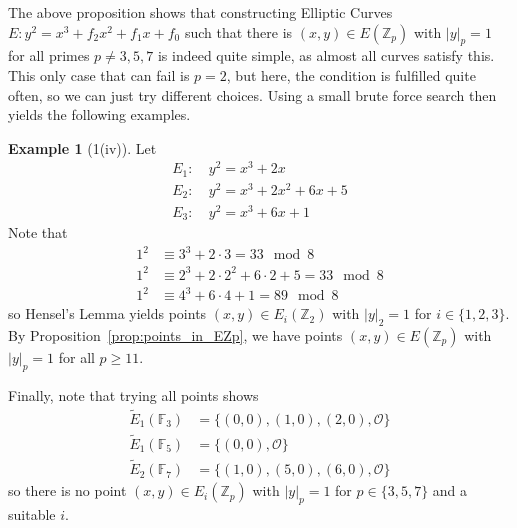 \documentclass{scrartcl}
\newcommand{\Z}{\mathbb{Z}}
\newcommand{\F}{\mathbb{F}}
\renewcommand{\O}{\mathcal{O}}
\theoremstyle{definition}
\newtheorem{example}[subsection]{Example}
\begin{document}
The above proposition shows that constructing Elliptic Curves $E: y^2 = x^3 + f_2 x^2 + f_1 x + f_0$ such that there is $(x, y) \in E(\Z_p)$ with $|y|_p = 1$ for all primes $p \neq 3, 5, 7$ is indeed quite simple, as almost all curves satisfy this.
This only case that can fail is $p = 2$, but here, the condition is fulfilled quite often, so we can just try different choices.
Using a small brute force search then yields the following examples.
\begin{example}[1(iv)]
    Let
    \begin{align*}
        E_1: \ &y^2 = x^3 + 2 x \\
        E_2: \ &y^2 = x^3 + 2 x^2 + 6 x + 5\\
        E_3: \ &y^2 = x^3 + 6x + 1
    \end{align*}
    Note that
    \begin{align*}
        1^2 &\equiv 3^3 + 2 \cdot 3 = 33 \mod 8 \\
        1^2 &\equiv 2^3 + 2 \cdot 2^2 + 6 \cdot 2 + 5 = 33 \mod 8 \\
        1^2 &\equiv 4^3 + 6 \cdot 4 + 1 = 89 \mod 8
    \end{align*}
    so Hensel's Lemma yields \cite[Thm 1.15]{lecture} points $(x, y) \in E_i(\Z_2)$ with $|y|_2 = 1$ for $i \in \{1, 2, 3\}$.
    By Proposition~\ref{prop:points_in_EZp}, we have points $(x, y) \in E(\Z_p)$ with $|y|_p = 1$ for all $p \geq 11$.

    Finally, note that trying all points shows
    \begin{align*}
        \tilde{E}_1(\F_3) &= \{ (0, 0), (1, 0), (2, 0), \O \} \\
        \tilde{E}_1(\F_5) &= \{ (0, 0), \O \} \\
        \tilde{E}_2(\F_7) &= \{ (1, 0), (5, 0), (6, 0), \O \}
    \end{align*}
    so there is no point $(x, y) \in E_i(\Z_p)$ with $|y|_p = 1$ for $p \in \{3, 5, 7\}$ and a suitable $i$. 
\end{example}
\end{document}
